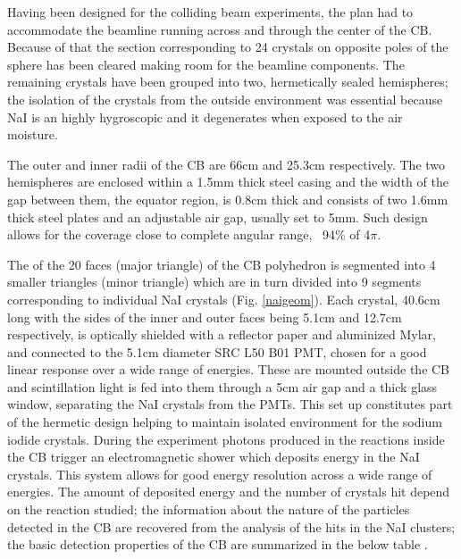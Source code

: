 \indent Having  been  designed  for  the  colliding  beam  experiments,  the  plan  had  to accommodate  the  beamline  running  across  and  through the  center  of  the  CB. Because of that the section corresponding to 24 crystals on opposite poles of the sphere  has  been  cleared  making  room  for  the  beamline  components.  The remaining crystals have been grouped into two, hermetically sealed hemispheres; the isolation of the crystals from the outside environment was essential because NaI is an highly hygroscopic and it degenerates when exposed to the air moisture.

\indent The outer and inner radii of the CB are 66cm and 25.3cm respectively. The two hemispheres are enclosed within a 1.5mm thick steel casing and the width of the gap between them, the equator region, is 0.8cm thick and consists of two 1.6mm thick steel plates and an adjustable air gap, usually set to 5mm. Such design allows for the coverage close to complete angular range, ~94\% of 4$\pi$.

\indent The of the 20 faces (major triangle) of the CB polyhedron is segmented into 4 smaller triangles (minor triangle)  which  are in turn divided into 9 segments corresponding to individual NaI crystals (Fig. \ref{naigeom}). Each crystal, 40.6cm long with the sides of the inner and outer faces being 5.1cm and 12.7cm respectively, is optically shielded with a reflector paper and aluminized Mylar, and connected to the 5.1cm diameter SRC L50 B01 PMT, chosen for a good linear response over a wide range of energies. These are mounted outside the CB and scintillation light is fed into them through a 5cm air gap and a thick glass window, separating the NaI crystals from the PMTs. This set up constitutes part of the hermetic design helping to maintain isolated environment for the sodium iodide crystals. During the experiment photons produced in the reactions inside the CB trigger an electromagnetic shower which deposits energy in the NaI crystals. This system allows for good energy resolution across a wide range of energies. The amount of deposited energy and the number of crystals hit depend on the reaction studied; the  information  about  the  nature  of  the  particles  detected  in  the  CB  are recovered from the analysis of the hits in the NaI clusters; the basic detection properties  of  the  CB  are  summarized  in  the  below  table \cite {starostin}.

